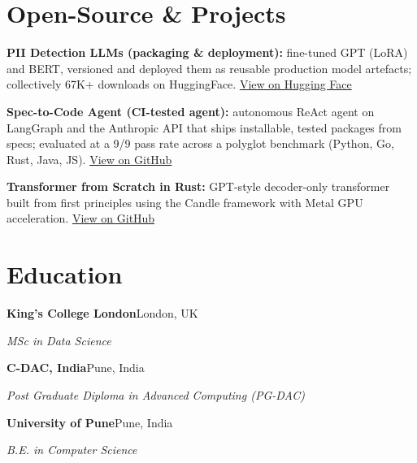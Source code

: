\documentclass[10pt,a4paper]{article}
\begin{document}
\section{Open-Source \& Projects}
\begin{tight}
  \item \textbf{PII Detection LLMs (packaging \& deployment):} fine-tuned GPT (LoRA) and BERT, versioned and deployed them as reusable production model artefacts; collectively 67K+ downloads on HuggingFace. \href{https://huggingface.co/ab-ai/pii_model}{View on Hugging Face}
  \item \textbf{Spec-to-Code Agent (CI-tested agent):} autonomous ReAct agent on LangGraph and the Anthropic API that ships installable, tested packages from specs; evaluated at a 9/9 pass rate across a polyglot benchmark (Python, Go, Rust, Java, JS). \href{https://github.com/abhijeetscode/Spec-to-Code-Agent}{View on GitHub}
  \item \textbf{Transformer from Scratch in Rust:} GPT-style decoder-only transformer built from first principles using the Candle framework with Metal GPU acceleration. \href{https://github.com/abhijeetscode/transformer-rust}{View on GitHub}
\end{tight}

\section{Education}
{\color{company}\bfseries King's College London}\hfill {\color{muted}London, UK}\par
{\itshape MSc in Data Science}\par\vspace{2pt}
{\color{company}\bfseries C-DAC, India}\hfill {\color{muted}Pune, India}\par
{\itshape Post Graduate Diploma in Advanced Computing (PG-DAC)}\par\vspace{2pt}
{\color{company}\bfseries University of Pune}\hfill {\color{muted}Pune, India}\par
{\itshape B.E. in Computer Science}\par
\end{document}
